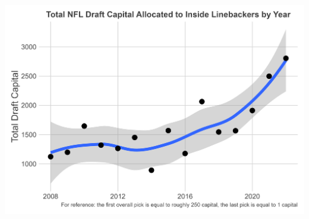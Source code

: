 \documentclass{article}
\begin{document}
\begin{enumerate}
    \linebreak
    \linebreak
      \parbox{\linewidth}{
        \includegraphics[width=14cm]{PS6c_Plaisance.png}
        \centering
        \\}
\end{enumerate}
\end{document}
